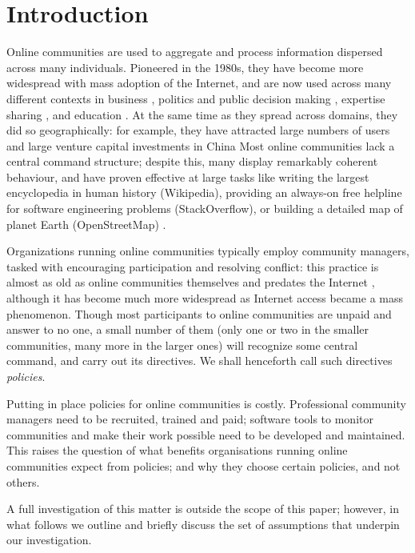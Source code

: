\section{Introduction}

Online communities are used to aggregate and process information dispersed across many individuals. Pioneered in the 1980s, they have become more widespread with mass adoption of the Internet, and are now used across many different contexts in business \cite{mcwilliam2012building, tapscott2008wikinomics}, politics and public decision making \cite{rheingold1993virtual, noveck2009wiki, cottica2010wikicrazia}, expertise sharing \cite{rheingold1993virtual, zhang2007expertise, shirky2008here}, and education \cite{milligan2013patterns}. At the same time as they spread across domains, they did so geographically: for example, they have attracted large numbers of users and large venture capital investments in China \cite{zhouSocialInfluence} Most online communities lack a central command structure; despite this, many display remarkably coherent behaviour, and have proven effective at large tasks like writing the largest encyclopedia in human history (Wikipedia), providing an always-on free helpline for software engineering problems (StackOverflow), or building a detailed map of planet Earth (OpenStreetMap) \cite{shirky2008here}. 

Organizations running online communities typically employ community managers, tasked with encouraging participation and resolving conflict: this practice is almost as old as online communities themselves and predates the Internet \cite{rheingold1993virtual}, although it has become much more widespread as Internet access became a mass phenomenon. Though most participants to online communities are unpaid and answer to no one, a small number of them (only one or two in the smaller communities, many more in the larger ones) will recognize some central command, and carry out its directives. We shall henceforth call such directives \emph{policies}. 

Putting in place policies for online communities is costly. Professional community managers need to be recruited, trained and paid; software tools to monitor communities and make their work possible need to be developed and maintained. This raises the question of what benefits organisations running online communities expect from policies; and why they choose certain policies, and not others. 

A full investigation of this matter is outside the scope of this paper; however, in what follows we outline and briefly discuss the set of assumptions that underpin our investigation. 

